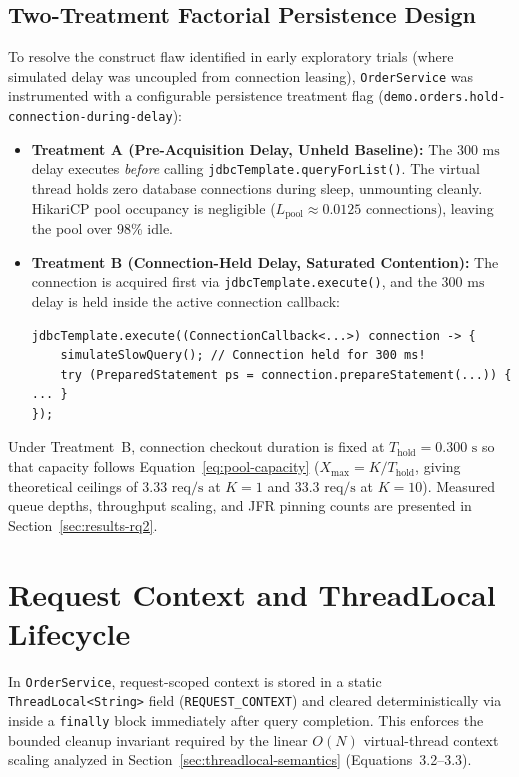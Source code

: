\subsection{Two-Treatment Factorial Persistence Design}
To resolve the construct flaw identified in early exploratory trials (where simulated delay was uncoupled from connection leasing), \texttt{OrderService} was instrumented with a configurable persistence treatment flag (\texttt{demo.orders.hold-connection-during-delay}):
\begin{itemize}
  \item \textbf{Treatment A (Pre-Acquisition Delay, Unheld Baseline):} The $300\text{ ms}$ delay executes \emph{before} calling \texttt{jdbcTemplate.queryForList()}. The virtual thread holds zero database connections during sleep, unmounting cleanly. HikariCP pool occupancy is negligible ($L_{\text{pool}} \approx 0.0125\text{ connections}$), leaving the pool over 98\% idle.
  \item \textbf{Treatment B (Connection-Held Delay, Saturated Contention):} The connection is acquired first via \texttt{jdbcTemplate.execute()}, and the $300\text{ ms}$ delay is held inside the active connection callback:
{\small
\begin{verbatim}
jdbcTemplate.execute((ConnectionCallback<...>) connection -> {
    simulateSlowQuery(); // Connection held for 300 ms!
    try (PreparedStatement ps = connection.prepareStatement(...)) { ... }
});
\end{verbatim}
}
\end{itemize}

Under Treatment~B, connection checkout duration is fixed at $T_{\text{hold}} = 0.300\text{ s}$ so that capacity follows Equation~\ref{eq:pool-capacity} ($X_{\text{max}} = K/T_{\text{hold}}$, giving theoretical ceilings of $3.33\text{ req/s}$ at $K=1$ and $33.3\text{ req/s}$ at $K=10$). Measured queue depths, throughput scaling, and JFR pinning counts are presented in Section~\ref{sec:results-rq2}.

\section{Request Context and ThreadLocal Lifecycle}
\label{sec:threadlocal-lifecycle}

In \texttt{OrderService}, request-scoped context is stored in a static \texttt{ThreadLocal<String>} field (\texttt{REQUEST\_CONTEXT}) and cleared deterministically via  inside a \texttt{finally} block immediately after query completion. This enforces the bounded cleanup invariant required by the linear $O(N)$ virtual-thread context scaling analyzed in Section~\ref{sec:threadlocal-semantics} (Equations~3.2--3.3).

